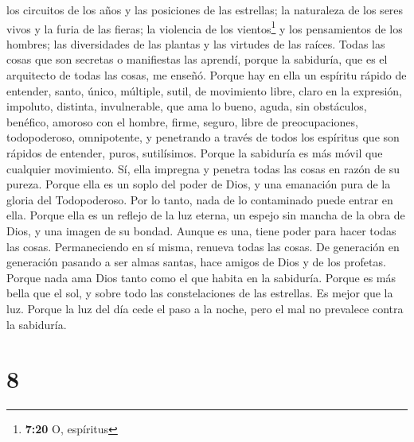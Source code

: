  los circuitos de los años y las posiciones de las
estrellas;  la naturaleza de los seres vivos y la furia
de las fieras; la violencia de los vientos\footnote{\textbf{7:20} O,
  espíritus} y los pensamientos de los hombres; las diversidades de las
plantas y las virtudes de las raíces.  Todas las cosas
que son secretas o manifiestas las aprendí,  porque la
sabiduría, que es el arquitecto de todas las cosas, me enseñó. Porque
hay en ella un espíritu rápido de entender, santo, único, múltiple,
sutil, de movimiento libre, claro en la expresión, impoluto, distinta,
invulnerable, que ama lo bueno, aguda, sin obstáculos, 
benéfico, amoroso con el hombre, firme, seguro, libre de preocupaciones,
todopoderoso, omnipotente, y penetrando a través de todos los espíritus
que son rápidos de entender, puros, sutilísimos.  Porque
la sabiduría es más móvil que cualquier movimiento. Sí, ella impregna y
penetra todas las cosas en razón de su pureza.  Porque
ella es un soplo del poder de Dios, y una emanación pura de la gloria
del Todopoderoso. Por lo tanto, nada de lo contaminado puede entrar en
ella.  Porque ella es un reflejo de la luz eterna, un
espejo sin mancha de la obra de Dios, y una imagen de su bondad.
 Aunque es una, tiene poder para hacer todas las cosas.
Permaneciendo en sí misma, renueva todas las cosas. De generación en
generación pasando a ser almas santas, hace amigos de Dios y de los
profetas.  Porque nada ama Dios tanto como el que habita
en la sabiduría.  Porque es más bella que el sol, y sobre
todo las constelaciones de las estrellas. Es mejor que la luz.
 Porque la luz del día cede el paso a la noche, pero el
mal no prevalece contra la sabiduría.

\hypertarget{section-7}{%
\section{8}\label{section-7}}

